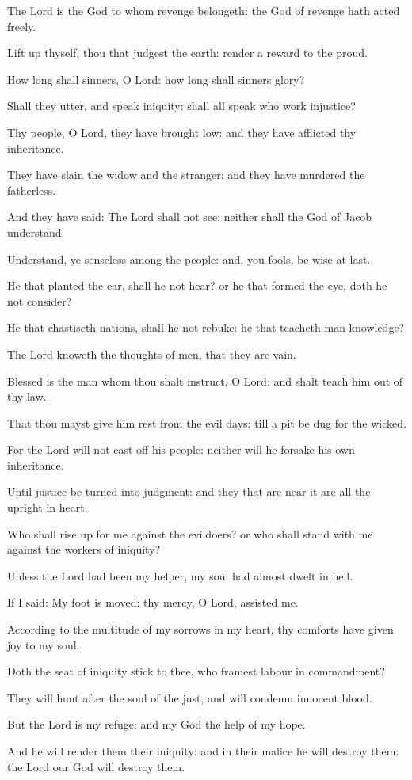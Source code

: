 ﻿\item The Lord is the God to whom revenge belongeth: the God of revenge hath acted freely.
\item Lift up thyself, thou that judgest the earth: render a reward to the proud.
\item How long shall sinners, O Lord: how long shall sinners glory?
\item Shall they utter, and speak iniquity: shall all speak who work injustice?
\item Thy people, O Lord, they have brought low: and they have afflicted thy inheritance.
\item They have slain the widow and the stranger: and they have murdered the fatherless.
\item And they have said: The Lord shall not see: neither shall the God of Jacob understand.
\item Understand, ye senseless among the people: and, you fools, be wise at last.
\item He that planted the ear, shall he not hear? or he that formed the eye, doth he not consider?
\item He that chastiseth nations, shall he not rebuke: he that teacheth man knowledge?
\item The Lord knoweth the thoughts of men, that they are vain.
\item Blessed is the man whom thou shalt instruct, O Lord: and shalt teach him out of thy law.
\item That thou mayst give him rest from the evil days: till a pit be dug for the wicked.
\item For the Lord will not cast off his people: neither will he forsake his own inheritance.
\item Until justice be turned into judgment: and they that are near it are all the upright in heart.
\item Who shall rise up for me against the evildoers? or who shall stand with me against the workers of iniquity?
\item Unless the Lord had been my helper, my soul had almost dwelt in hell.
\item If I said: My foot is moved: thy mercy, O Lord, assisted me.
\item According to the multitude of my sorrows in my heart, thy comforts have given joy to my soul.
\item Doth the seat of iniquity stick to thee, who framest labour in commandment?
\item They will hunt after the soul of the just, and will condemn innocent blood.
\item But the Lord is my refuge: and my God the help of my hope.
\item And he will render them their iniquity: and in their malice he will destroy them: the Lord our God will destroy them.
